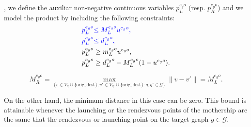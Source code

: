 \noindent
{}, we define the auxiliar non-negative continuous variables $p_L^{e_go}$ (resp. $p_R^{e_go}$) and we model the product by including the following constraints:
\begin{align*}
{\color{blue}p_L^{e_go}} & {\color{blue}\leq  M_L^{e_go}u^{e_go},}\\
{\color{blue}p_L^{e_go}} & {\color{blue}\leq d_L^{e_go},} \\
p_L^{e_go} & \geq m_L^{e_go} u^{e_go}, \\
p_L^{e_go} & \geq d_L^{e_go} - M_L^{e_go}(1-u^{e_go}).
\end{align*}

$$
M_R^{e_go} = \max_{\{v\in V_g\cup\{\text{orig}, \text{dest}\}, v'\in V_{g'}\cup\{\text{orig}, \text{dest}\} : g, g'\in\mathcal G\}} \|v - v'\| = M_L^{e_go}.
$$

\noindent
On the other hand, the minimum distance in this case can be zero. This bound is attainable whenever the launching or the rendezvous points of the mothership are the same that the rendezvous or launching point on the target graph $g\in \mathcal{G}$.



